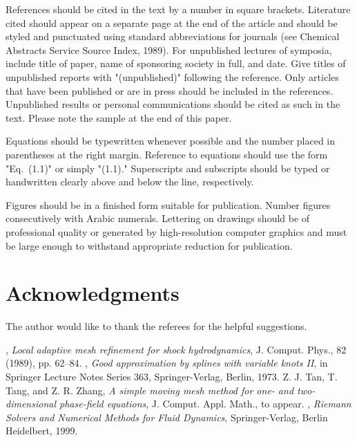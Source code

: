 \documentclass{eajam}
\begin{document}
References should be cited in the text by a number in square brackets. Literature cited should appear on a
separate page at the end of the article and should be styled and punctuated using standard abbreviations for
journals (see Chemical Abstracts Service Source Index, 1989). For unpublished lectures of symposia,
include title of paper, name of sponsoring society in full, and date. Give titles of unpublished reports
with "(unpublished)" following the reference. Only articles that have been published or are in press
should be included in the references. Unpublished results or personal communications should be cited
as such in the text.
Please note the sample at the end of this paper.

Equations should be typewritten whenever possible and the number
placed in parentheses at the right margin. Reference to equations
should use the form "Eq.~(1.1)" or simply "(1.1)." Superscripts and
subscripts should be typed or handwritten clearly above and below
the line, respectively.

Figures should be in a finished form suitable for publication. Number figures consecutively with Arabic numerals.
Lettering on drawings should be of professional quality or generated by high-resolution computer graphics and
must be large enough to withstand appropriate reduction for publication.


\section*{Acknowledgments}
The author would like to thank the referees for the helpful
suggestions.

\begin{thebibliography}{99}
, {\em Local adaptive mesh refinement
for shock hydrodynamics}, J. Comput. Phys., 82 (1989), pp. 62--84.
, {\em Good approximation by splines with variable knots II}, in Springer Lecture
 Notes Series 363, Springer-Verlag, Berlin, 1973.
 {\sc Z. J. Tan, T. Tang, and Z. R. Zhang}, {\em A simple moving mesh method for one- and
two-dimensional phase-field equations}, J. Comput. Appl. Math., to
appear.
, {\em Riemann Solvers and Numerical Methods for Fluid
Dynamics}, Springer-Verlag, Berlin Heidelbert, 1999.
\end{thebibliography}
\end{document}
